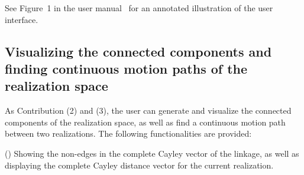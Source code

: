 \documentclass[prodmode,acmtoms]{acmsmall}
\begin{document}
See Figure~1 in the user manual~\cite{userman} for an annotated illustration of the user interface.
 

\subsection{Visualizing the connected components and finding continuous motion paths of the realization space}\label{subsec:connected_component}
%
%

As Contribution (2) and (3),
the user can generate and visualize the connected components of the realization space,  
as well as find a continuous motion path between two realizations. 
The following functionalities are provided: %

\noindent() Showing the non-edges in the complete Cayley vector of the linkage, 
as well as displaying the complete Cayley distance vector for the current realization. 
\end{document}
